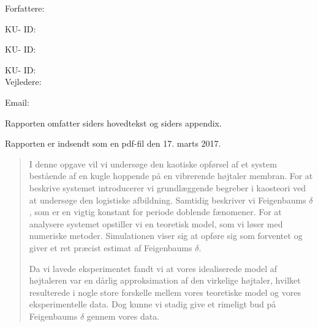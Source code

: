 \documentclass[12pt,oneside,a4paper]{article}
\numberwithin{equation}{section}
\begin{document}
\vfill
{\large Forfattere:}\\
{\large \hspace*{1cm}   \hspace{1cm} KU- ID:  \\
{\large \hspace*{1cm}    \hspace{1cm} KU- ID:  \\
{\large \hspace*{1cm}    \hspace{1cm} KU- ID:  \\

{\large Vejledere:}\\
{\large \hspace*{1cm}   \hspace{1cm} Email:  \\

\vfill

{\large Rapporten omfatter {\bf {}} siders 
hovedtekst og 
{\bf 
{}} siders appendix.}

{\large Rapporten er indsendt som en pdf-fil den 17. marts 2017. }

\normalsize


\newpage
{}
\begin{abstract}
\setlength{\parindent}{0cm}
\setlength{\parskip}{0.3cm}
\noindent I denne opgave vil vi undersøge den kaotiske opførsel af et system 
bestående af en  kugle hoppende på en vibrerende højtaler membran. For at 
beskrive systemet introducerer vi grundlæggende begreber i kaosteori ved at 
undersøge den logistiske afbildning. Samtidig beskriver vi Feigenbaums 
$\delta$, som er en vigtig konstant for periode doblende fænomener. For at 
analysere systemet opstiller vi en teoretisk model, som vi løser med numeriske 
metoder. Simulationen viser sig at opføre sig som forventet og giver et ret 
præcist estimat af Feigenbaums $\delta$.

Da vi lavede eksperimentet fandt vi at vores idealiserede model af højtaleren var en dårlig approksimation af den virkelige højtaler, hvilket resulterede i nogle store forskelle mellem vores teoretiske model og vores eksperimentelle data. Dog kunne vi stadig give et rimeligt bud på Feigenbaums $\delta$ gennem vores data.



\end{abstract}}}}}
\end{document}
